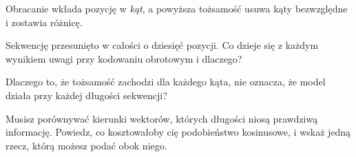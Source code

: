\begin{furtherproblems}
{  Obracanie wkłada pozycję w \emph{kąt}, a powyższa tożsamość usuwa kąty
  bezwzględne i zostawia różnicę.}
\item Sekwencję przesunięto w całości o dziesięć pozycji. Co dzieje się z
  każdym wynikiem uwagi przy kodowaniu obrotowym i dlaczego?
\item Dlaczego to, że tożsamość zachodzi dla każdego kąta, nie oznacza, że
  model działa przy każdej długości sekwencji?
\item Musisz porównywać kierunki wektorów, których długości niosą prawdziwą
  informację. Powiedz, co kosztowałoby cię podobieństwo kosinusowe, i wskaż
  jedną rzecz, którą możesz podać obok niego.
\end{furtherproblems}
